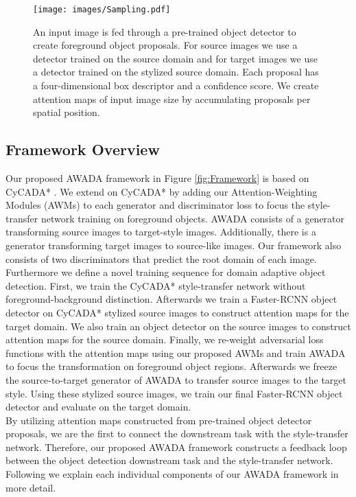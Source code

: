 \documentclass[10pt,twocolumn,letterpaper]{article}
\begin{document}
\begin{figure*}[t]
	\centering
	\texttt{[image: images/Sampling.pdf]}
	\caption{An input image is fed through a pre-trained object detector to create foreground object proposals. For source images we use a detector trained on the source domain and for target images we use a detector trained on the stylized source domain. Each proposal has a four-dimensional box descriptor and a confidence score. We create attention maps of input image size by accumulating proposals per spatial position.}
	\label{fig:Sampling}
\end{figure*}

\subsection{Framework Overview}

Our proposed AWADA framework in Figure \ref{fig:Framework} is based on CyCADA* \cite{menke2022}. We extend on CyCADA* by adding our Attention-Weighting Modules (AWMs) to each generator and discriminator loss to focus the style-transfer network training on foreground objects. AWADA consists of a generator transforming source images to target-style images. Additionally, there is a generator transforming target images to source-like images. Our framework also consists of two discriminators that predict the root domain of each image. \\
Furthermore we define a novel training sequence for domain adaptive object detection. First, we train the CyCADA* style-transfer network without foreground-background distinction. Afterwards we train a Faster-RCNN \cite{FasterRCNN} object detector on CyCADA* stylized source images  to construct attention maps for the target domain. We also train an object detector on the source images to construct attention maps for the source domain. Finally, we re-weight adversarial loss functions with the attention maps using our proposed AWMs and train AWADA to focus the transformation on foreground object regions. Afterwards we freeze the source-to-target generator of AWADA to transfer source images to the target style. Using these stylized source images, we train our final Faster-RCNN object detector and evaluate on the target domain. \\
By utilizing attention maps constructed from pre-trained object detector proposals, we are the first to connect the downstream task with the style-transfer network. Therefore, our proposed AWADA framework constructs a feedback loop between the object detection downstream task and the style-transfer network. Following we explain each individual components of our AWADA framework in more detail.
\end{document}
